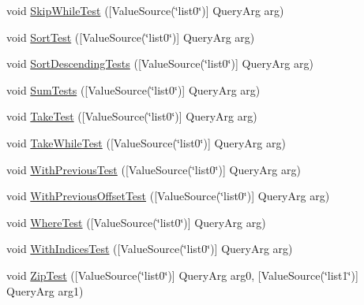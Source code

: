 \begin{DoxyCompactItemize}
\item 
void \mbox{\hyperlink{class_leap_1_1_unity_1_1_tests_1_1_query_tests_a1004cfd5e1d18bb4ff27c370eae01ec8}{Skip\+While\+Test}} (\mbox{[}Value\+Source(\char`\"{}list0\char`\"{})\mbox{]} Query\+Arg arg)
\item 
void \mbox{\hyperlink{class_leap_1_1_unity_1_1_tests_1_1_query_tests_ab85c5fe055b651124deddaa512648c8d}{Sort\+Test}} (\mbox{[}Value\+Source(\char`\"{}list0\char`\"{})\mbox{]} Query\+Arg arg)
\item 
void \mbox{\hyperlink{class_leap_1_1_unity_1_1_tests_1_1_query_tests_a4aee7357957aabbb0585cafeff7df189}{Sort\+Descending\+Tests}} (\mbox{[}Value\+Source(\char`\"{}list0\char`\"{})\mbox{]} Query\+Arg arg)
\item 
void \mbox{\hyperlink{class_leap_1_1_unity_1_1_tests_1_1_query_tests_ad29d20b0c9c0262b198dbc55e9c83237}{Sum\+Tests}} (\mbox{[}Value\+Source(\char`\"{}list0\char`\"{})\mbox{]} Query\+Arg arg)
\item 
void \mbox{\hyperlink{class_leap_1_1_unity_1_1_tests_1_1_query_tests_afb330f57ceaa257a37d3e5fdde110e68}{Take\+Test}} (\mbox{[}Value\+Source(\char`\"{}list0\char`\"{})\mbox{]} Query\+Arg arg)
\item 
void \mbox{\hyperlink{class_leap_1_1_unity_1_1_tests_1_1_query_tests_a8ed6ce829e8eaee9939300d6da3ead4e}{Take\+While\+Test}} (\mbox{[}Value\+Source(\char`\"{}list0\char`\"{})\mbox{]} Query\+Arg arg)
\item 
void \mbox{\hyperlink{class_leap_1_1_unity_1_1_tests_1_1_query_tests_a6dbf45b48855e817e5ed3c71d522507a}{With\+Previous\+Test}} (\mbox{[}Value\+Source(\char`\"{}list0\char`\"{})\mbox{]} Query\+Arg arg)
\item 
void \mbox{\hyperlink{class_leap_1_1_unity_1_1_tests_1_1_query_tests_a88b251c46c9a85ea40c3eb67d50c70e5}{With\+Previous\+Offset\+Test}} (\mbox{[}Value\+Source(\char`\"{}list0\char`\"{})\mbox{]} Query\+Arg arg)
\item 
void \mbox{\hyperlink{class_leap_1_1_unity_1_1_tests_1_1_query_tests_aa39732c88269e10d894ab1233a252215}{Where\+Test}} (\mbox{[}Value\+Source(\char`\"{}list0\char`\"{})\mbox{]} Query\+Arg arg)
\item 
void \mbox{\hyperlink{class_leap_1_1_unity_1_1_tests_1_1_query_tests_a786f6275e4a09958d102bdf47bcf5cd7}{With\+Indices\+Test}} (\mbox{[}Value\+Source(\char`\"{}list0\char`\"{})\mbox{]} Query\+Arg arg)
\item 
void \mbox{\hyperlink{class_leap_1_1_unity_1_1_tests_1_1_query_tests_a533a30e78ecc23326b974002ffda3b87}{Zip\+Test}} (\mbox{[}Value\+Source(\char`\"{}list0\char`\"{})\mbox{]} Query\+Arg arg0, \mbox{[}Value\+Source(\char`\"{}list1\char`\"{})\mbox{]} Query\+Arg arg1)
\end{DoxyCompactItemize}


